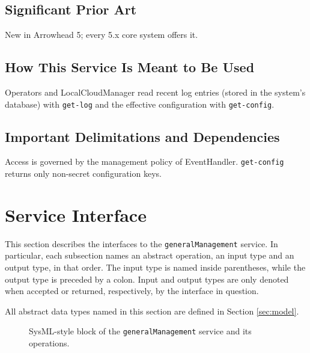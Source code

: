 \documentclass[a4paper]{arrowhead}
\begin{document}
\subsection{Significant Prior Art}

New in Arrowhead 5; every 5.x core system offers it.

\subsection{How This Service Is Meant to Be Used}

Operators and LocalCloudManager read recent log entries (stored in the system's database) with \texttt{get-\allowbreak{}log} and the effective configuration with \texttt{get-\allowbreak{}config}.

\subsection{Important Delimitations and Dependencies}
\label{sec:delimitations}

Access is governed by the management policy of EventHandler. \texttt{get-\allowbreak{}config} returns only non-secret configuration keys.

\newpage

\section{Service Interface}
\label{sec:operations}

This section describes the interfaces to the \texttt{generalManagement} service.
In particular, each subsection names an abstract operation, an input type and an output type, in that order.
The input type is named inside parentheses, while the output type is preceded by a colon.
Input and output types are only denoted when accepted or returned, respectively, by the interface in question.

All abstract data types named in this section are defined in Section \ref{sec:model}.

\begin{figure}[ht!]
  \centering
  \caption{SysML-style block of the \texttt{generalManagement} service and its operations.}
  \label{fig:SD}
\end{figure}
\end{document}

